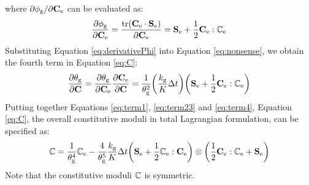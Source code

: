 where $\partial\phi_{\mathrm{g}}/\partial\bold{C}_{\mathrm{e}}$ can be evaluated as:
\begin{equation} \label{eq:derivativePhi}
\frac{\partial\phi_{\mathrm{g}}}{\partial\bold{C}_{\mathrm{e}}} = \frac{\mathrm{tr}(\bold{C}_{\mathrm{e}}\cdot\bold{S}_{\mathrm{e}})}{\partial\bold{C}_{\mathrm{e}}} = \bold{S}_{\mathrm{e}} + \frac{1}{2}\bold{C}_{\mathrm{e}} : \mathbb{C}_{\mathrm{e}}
\end{equation}
Substituting Equation \ref{eq:derivativePhi} into Equation \ref{eq:nonsense}, we obtain the fourth term in Equation \ref{eq:C}:
\begin{equation} \label{eq:term4}
\frac{\partial\theta_{\mathrm{g}}}{\partial\bold{C}} = \frac{\partial\theta_{\mathrm{g}}}{\partial\bold{C}_{\mathrm{e}}} \frac{\partial\bold{C}_{\mathrm{e}}}{\partial\bold{C}} =  \frac{1}{\theta_{\mathrm{g}}^2} \bigg(\frac{k_{\mathrm{g}}}{K}\Delta t\bigg) \bigg( \bold{S}_{\mathrm{e}} + \frac{1}{2}\bold{C}_{\mathrm{e}} : \mathbb{C}_{\mathrm{e}}\bigg)
\end{equation}
Putting together Equations \ref{eq:term1}, \ref{eq:term23} and \ref{eq:term4}, Equation \ref{eq:C}, the overall constitutive moduli in total Lagrangian formulation, can be specified as:
\begin{equation} \label{eq:C2}
\mathbb{C} = \frac{1}{\theta_{\mathrm{g}}^4}\mathbb{C}_{\mathrm{e}} - \frac{4}{\theta_{\mathrm{g}}^5}\frac{k_{\mathrm{g}}}{K}\Delta t\bigg(\bold{S}_{\mathrm{e}} + \frac{1}{2}\mathbb{C}_{\mathrm{e}} : \bold{C}_{\mathrm{e}} \bigg) \otimes \bigg( \frac{1}{2} \bold{C}_{\mathrm{e}} : \mathbb{C}_{\mathrm{e}} + \bold{S}_{\mathrm{e}} \bigg)
\end{equation}
Note that the constitutive moduli $\mathbb{C}$ is symmetric.

